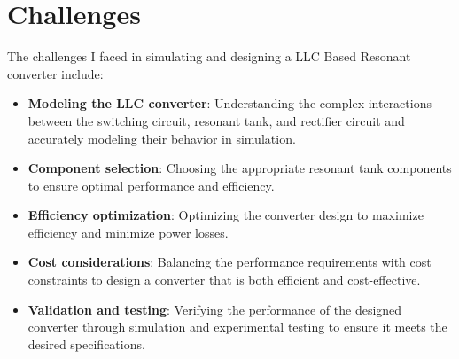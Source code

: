 \section{Challenges}
The challenges I faced in simulating and designing a LLC Based Resonant converter include:
\begin{itemize}
    \item \textbf{Modeling the LLC converter}: Understanding the complex interactions between the switching circuit, resonant tank, and rectifier circuit and accurately modeling their behavior in simulation.

    \item \textbf{Component selection}: Choosing the appropriate resonant tank components to ensure optimal performance and efficiency.

    \item \textbf{Efficiency optimization}: Optimizing the converter design to maximize efficiency and minimize power losses.

    \item \textbf{Cost considerations}: Balancing the performance requirements with cost constraints to design a converter that is both efficient and cost-effective.

    \item \textbf{Validation and testing}: Verifying the performance of the designed converter through simulation and experimental testing to ensure it meets the desired specifications.
\end{itemize}